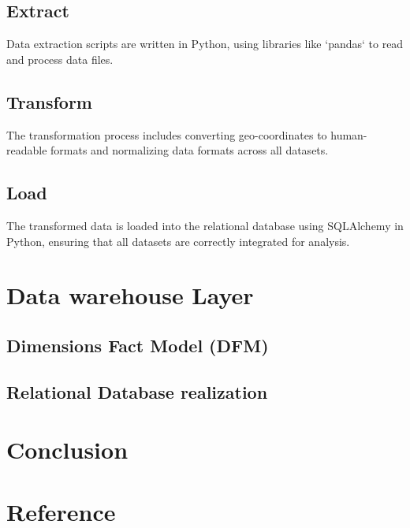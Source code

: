 \documentclass[conference]{IEEEtran}
\begin{document}
	\subsection{Extract}
	Data extraction scripts are written in Python, using libraries like `pandas` to read and process data files.
	
	\subsection{Transform}
	The transformation process includes converting geo-coordinates to human-readable formats and normalizing data formats across all datasets.
	
	\subsection{Load}
	The transformed data is loaded into the relational database using SQLAlchemy in Python, ensuring that all datasets are correctly integrated for analysis.
	
	\section{Data warehouse Layer}
	
	\subsection{Dimensions Fact Model (DFM)}
	
	\subsection{Relational Database realization}

	\section{Conclusion}
	
	\section{Reference}
	
	
	
	
	
\end{document}
